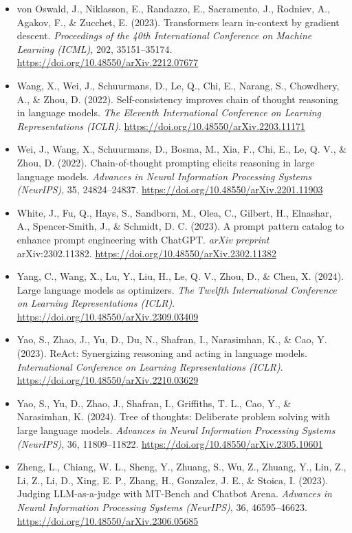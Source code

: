 \begin{itemize}[leftmargin=1.5em, label={}, itemsep=0.22ex, parsep=0pt]
    \item von Oswald, J., Niklasson, E., Randazzo, E., Sacramento, J., Rodniev, A., Agakov, F., \& Zucchet, E. (2023). Transformers learn in-context by gradient descent. \textit{Proceedings of the 40th International Conference on Machine Learning (ICML)}, 202, 35151--35174. \url{https://doi.org/10.48550/arXiv.2212.07677}
    \item Wang, X., Wei, J., Schuurmans, D., Le, Q., Chi, E., Narang, S., Chowdhery, A., \& Zhou, D. (2022). Self-consistency improves chain of thought reasoning in language models. \textit{The Eleventh International Conference on Learning Representations (ICLR)}. \url{https://doi.org/10.48550/arXiv.2203.11171}
    \item Wei, J., Wang, X., Schuurmans, D., Bosma, M., Xia, F., Chi, E., Le, Q. V., \& Zhou, D. (2022). Chain-of-thought prompting elicits reasoning in large language models. \textit{Advances in Neural Information Processing Systems (NeurIPS)}, 35, 24824--24837. \url{https://doi.org/10.48550/arXiv.2201.11903}
    \item White, J., Fu, Q., Hays, S., Sandborn, M., Olea, C., Gilbert, H., Elnashar, A., Spencer-Smith, J., \& Schmidt, D. C. (2023). A prompt pattern catalog to enhance prompt engineering with ChatGPT. \textit{arXiv preprint} arXiv:2302.11382. \url{https://doi.org/10.48550/arXiv.2302.11382}
    \item Yang, C., Wang, X., Lu, Y., Liu, H., Le, Q. V., Zhou, D., \& Chen, X. (2024). Large language models as optimizers. \textit{The Twelfth International Conference on Learning Representations (ICLR)}. \url{https://doi.org/10.48550/arXiv.2309.03409}
    \item Yao, S., Zhao, J., Yu, D., Du, N., Shafran, I., Narasimhan, K., \& Cao, Y. (2023). ReAct: Synergizing reasoning and acting in language models. \textit{International Conference on Learning Representations (ICLR)}. \url{https://doi.org/10.48550/arXiv.2210.03629}
    \item Yao, S., Yu, D., Zhao, J., Shafran, I., Griffiths, T. L., Cao, Y., \& Narasimhan, K. (2024). Tree of thoughts: Deliberate problem solving with large language models. \textit{Advances in Neural Information Processing Systems (NeurIPS)}, 36, 11809--11822. \url{https://doi.org/10.48550/arXiv.2305.10601}
    \item Zheng, L., Chiang, W. L., Sheng, Y., Zhuang, S., Wu, Z., Zhuang, Y., Lin, Z., Li, Z., Li, D., Xing, E. P., Zhang, H., Gonzalez, J. E., \& Stoica, I. (2023). Judging LLM-as-a-judge with MT-Bench and Chatbot Arena. \textit{Advances in Neural Information Processing Systems (NeurIPS)}, 36, 46595--46623. \url{https://doi.org/10.48550/arXiv.2306.05685}

\end{itemize}
